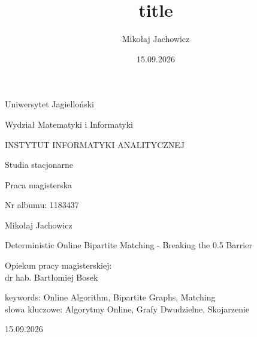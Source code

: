 \documentclass[fleqn]{report}
\title{title}
\author{Mikołaj Jachowicz}
\date{15.09.2026}
\numberwithin{remark}{section}
\numberwithin{lemma}{section}
\numberwithin{definition}{section}
\numberwithin{claim}{section}
\numberwithin{fact}{section}
\theoremstyle{case}
\begin{document}
\thispagestyle{empty}
\begin{center}{\sc \large
Uniwersytet Jagielloński\par\vspace{0.2cm}\par
Wydział Matematyki i Informatyki}\par\vspace{0.3cm}\par
{\LARGE
INSTYTUT INFORMATYKI ANALITYCZNEJ}\par\vspace{0.2cm}\par
{\large
Studia stacjonarne}\par\vspace{1cm}\par
{\Large
Praca magisterska}%
\end{center}
\vspace{1.5cm}
\begin{flushleft}
{\large
Nr albumu: 1183437}%
\end{flushleft}
\vspace{1.5cm}
\begin{center}
{\LARGE
Mikołaj Jachowicz%
}\par\vspace{0.9cm}\par
{\huge
Deterministic Online Bipartite Matching - Breaking the 0.5 Barrier%
}
\end{center}
\vspace{4cm}
\begin{flushright}

Opiekun pracy magisterskiej:\\
dr hab. Bartłomiej Bosek%
\end{flushright}
\vfill
keywords: Online Algorithm, Bipartite Graphs, Matching\\
słowa kluczowe: Algorytmy Online, Grafy Dwudzielne, Skojarzenie
\vfill
\begin{center}
15.09.2026%
\end{center}


\leavevmode\thispagestyle{empty}\newpage



\begin{abstract}
	
\end{abstract}
\renewcommand{\abstractname}{Streszczenie}
\begin{abstract}
	
\end{abstract}
\end{document}
